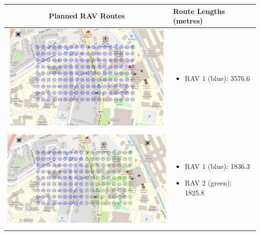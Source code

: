 \begin{table}[H]
  \centering
  \begin{tabular}{ | c | m{5cm} | }
    \hline
    Planned RAV Routes & Route Lengths (metres) \\
    \hline
    
    \begin{minipage}[c][53mm][c]{.6\textwidth}
      \includegraphics[width=\linewidth, height=51mm]{Chapters/MultiAgentCoverage/MultipleTravellingSalesman/Figs/Rectangle/SingleAgent.PNG}

    \end{minipage}
    &
    \begin{itemize}[leftmargin=*]
      \item[] RAV 1 (blue): 3576.6
    \end{itemize}
    \\
    \hline
    \begin{minipage}[c][53mm][c]{.6\textwidth}
      \includegraphics[width=\linewidth, height=51mm]{Chapters/MultiAgentCoverage/MultipleTravellingSalesman/Figs/Rectangle/TwoAgent.PNG}
    \end{minipage}
    &
    \begin{itemize}[leftmargin=*]
        \item[] RAV 1 (blue): 1836.3
        \item[] RAV 2 (green): 1825.8
    \end{itemize}
    \\
    \hline
    

\end{tabular}
\end{table}
